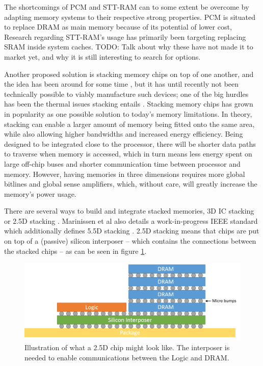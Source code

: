The shortcomings of PCM and STT-RAM can to some extent be overcome by adapting memory systems to their respective strong properties. PCM is situated to replace DRAM as main memory because of its potential of lower cost, 
Research regarding STT-RAM's usage has primarily been targeting replacing SRAM inside system caches. 
TODO: Talk about why these have not made it to market yet, and why it is still interesting to search for options.
\bigskip

Another proposed solution is stacking memory chips on top of one another, and the idea has been around for some time \cite{lee2000three}\cite{jacob2005predicting}\cite{black2006stacking}, but it has until recently not been technically possible to viably manufacture such devices; one of the big hurdles has been the thermal issues stacking entails \cite{5074080}. Stacking memory chips has grown in popularity as one possible solution to today's memory limitations. In theory, stacking can enable a larger amount of memory being fitted onto the same area, while also allowing higher bandwidths and increased energy efficiency\cite{Lee:2016:SMA:2836331.2832911}. Being designed to be integrated close to the processor, there will be shorter data paths to traverse when memory is accessed, which in turn means less energy spent on large off-chip buses and shorter communication time between processor and memory. However, having memories in three dimensions requires more global bitlines and global sense amplifiers, which, without care, will greatly increase the memory's power usage.
\bigskip

There are several ways to build and integrate stacked memories, 3D IC stacking or 2.5D stacking \cite{6248905}\cite{5702702}\cite{6248842}. Marinissen et al also details a work-in-progress IEEE standard which additionally defines 5.5D stacking \cite{7519330}. 2.5D stacking means that chips are put on top of a (passive) silicon interposer -- which contains the connections between the stacked chips -- as can be seen in figure \ref{2D-chip}. 

\begin{figure}[!h]
\centering
\includegraphics[width=0.75\linewidth]{figure/2D-integration.png}
\caption{Illustration of what a 2.5D chip might look like. The interposer is needed to enable communications between the Logic and DRAM. }
\label{2D-chip}
\end{figure}

